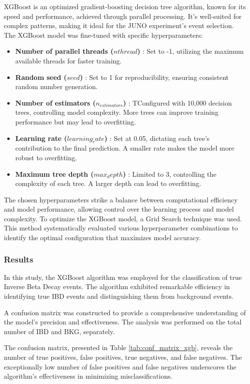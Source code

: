 XGBoost is an optimized gradient-boosting decision tree algorithm, known for its speed and performance, achieved through parallel processing. It's well-suited for complex patterns, making it ideal for the JUNO experiment's event selection.
The XGBoost model was fine-tuned with specific hyperparameters:

\begin{itemize}
	\item  \textbf{Number of parallel threads ($nthread$)} :  Set to -1, utilizing the maximum available threads for faster training.
	\item  \textbf{Random seed ($seed$)} : Set to 1 for reproducibility, ensuring consistent random number generation.
	\item  \textbf{Number of estimators ($n_{estimators}$)} : TConfigured with 10,000 decision trees, controlling model complexity. More trees can improve training performance but may lead to overfitting.
	\item  \textbf{Learning rate ($learning_rate$)} : Set at 0.05, dictating each tree's contribution to the final prediction. A smaller rate makes the model more robust to overfitting.
	\item  \textbf{Maximum tree depth ($max_depth$)} : Limited to 3, controlling the complexity of each tree. A larger depth can lead to overfitting.
\end{itemize}
The chosen hyperparameters strike a balance between computational efficiency and model performance, allowing control over the learning process and model complexity. To optimize the XGBoost model, a Grid Search technique was used. This method systematically evaluated various hyperparameter combinations to identify the optimal configuration that maximizes model accuracy.



\subsubsection{Results}
In this study, the XGBoost algorithm was employed for the classification of true Inverse Beta Decay events. The algorithm exhibited remarkable efficiency in identifying true IBD events and distinguishing them from background events.

A confusion matrix was constructed to provide a comprehensive understanding of the model's precision and effectiveness. The analysis was performed on the total number of IBD and BKG, separately.

The confusion matrix, presented in Table \ref{tab:conf_matrix_xgb}, reveals the number of true positives, false positives, true negatives, and false negatives. The exceptionally low number of false positives and false negatives underscores the algorithm's effectiveness in minimizing misclassifications.

